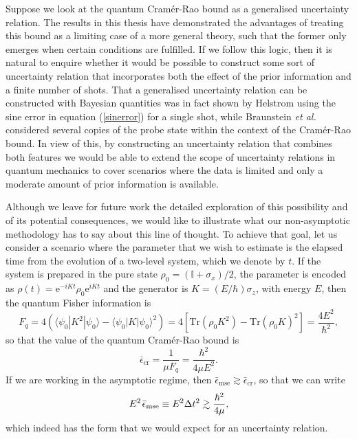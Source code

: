 Suppose we look at the quantum Cram\'{e}r-Rao bound as a generalised uncertainty relation. The results in this thesis have demonstrated the advantages of treating this bound as a limiting case of a more general theory, such that the former only emerges when certain conditions are fulfilled. If we follow this logic, then it is natural to enquire whether it would be possible to construct some sort of uncertainty relation that incorporates both the effect of the prior information and a finite number of shots. That a generalised uncertainty relation can be constructed with Bayesian quantities was in fact shown by Helstrom \cite{helstrom1976} using the sine error in equation (\ref{sinerror}) for a single shot, while Braunstein \emph{et al.} \cite{braunstein1996} considered several copies of the probe state within the context of the Cram\'{e}r-Rao bound. In view of this, by constructing an uncertainty relation that combines both features we would be able to extend the scope of uncertainty relations in quantum mechanics to cover scenarios where the data is limited and only a moderate amount of prior information is available. 

Although we leave for future work the detailed exploration of this possibility and of its potential consequences, we would like to illustrate what our non-asymptotic methodology has to say about this line of thought. To achieve that goal, let us consider a scenario where the parameter that we wish to estimate is the elapsed time from the evolution of a two-level system, which we denote by $t$. If the system is prepared in the pure state $\rho_0 = (\mathbb{I}+\sigma_x)/2$, the parameter is encoded as $\rho(t) = \mathrm{e}^{-i K t} \rho_0 \mathrm{e}^{i K t}$ and the generator is $K = (E/\hbar)\sigma_z$, with energy $E$, then the quantum Fisher information is
\begin{equation}
F_q = 4\left(\langle \psi_0 | K^2 | \psi_0 \rangle - \langle \psi_0 | K | \psi_0 \rangle^2\right) = 4\left[\mathrm{Tr}(\rho_0 K^2) -\mathrm{Tr}\left(\rho_0 K\right)^2\right] = \frac{4 E^2}{\hbar^2},
\end{equation}
so that the value of the quantum Cram\'{e}r-Rao bound is
\begin{equation}
\bar{\epsilon}_\mathrm{cr} = \frac{1}{\mu F_q} = \frac{\hbar^2}{4\mu E^2}.
\end{equation}
If we are working in the asymptotic regime, then $\bar{\epsilon}_{\mathrm{mse}}\gtrsim \bar{\epsilon}_{\mathrm{cr}}$, so that we can write 
\begin{equation}
E^2 \hspace{0.1em}\bar{\epsilon}_{\mathrm{mse}} \equiv E^2 \Delta t^2 \gtrsim \frac{\hbar^2}{4\mu},
\end{equation}
which indeed has the form that we would expect for an uncertainty relation.

